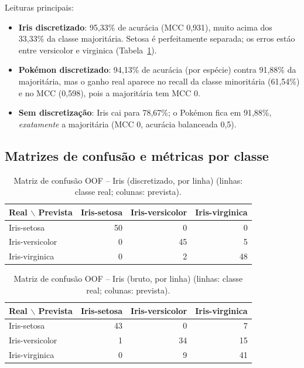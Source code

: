 \documentclass[a4paper,11pt]{article}
\begin{document}
Leituras principais:
\begin{itemize}
  \item \textbf{Iris discretizado}: 95,33\% de acur\'acia (MCC 0,931), muito acima dos 33,33\% da classe majorit\'aria. Setosa \'e perfeitamente separada; os erros est\'ao entre versicolor e virginica (Tabela~\ref{tab:conf_iris_disc}).
  \item \textbf{Pok\'emon discretizado}: 94,13\% de acur\'acia (por esp\'ecie) contra 91,88\% da majorit\'aria, mas o ganho real aparece no recall da classe minorit\'aria (61,54\%) e no MCC (0,598), pois a majorit\'aria tem MCC 0.
  \item \textbf{Sem discretiza\c{c}\~ao}: Iris cai para 78,67\%; o Pok\'emon fica em 91,88\%, \emph{exatamente} a majorit\'aria (MCC 0, acur\'acia balanceada 0,5).
\end{itemize}

\subsection{Matrizes de confus\~ao e m\'etricas por classe}
\begin{table}[htbp]
\centering
\small
\caption{Matriz de confusão OOF -- Iris (discretizado, por linha) (linhas: classe real; colunas: prevista).}
\label{tab:conf_iris_disc}
\begin{tabular}{lrrr}
\toprule
Real $\backslash$ Prevista & Iris-setosa & Iris-versicolor & Iris-virginica \\
\midrule
Iris-setosa & 50 & 0 & 0 \\
Iris-versicolor & 0 & 45 & 5 \\
Iris-virginica & 0 & 2 & 48 \\
\bottomrule
\end{tabular}
\end{table}

\begin{table}[htbp]
\centering
\small
\caption{Matriz de confusão OOF -- Iris (bruto, por linha) (linhas: classe real; colunas: prevista).}
\label{tab:conf_iris_raw}
\begin{tabular}{lrrr}
\toprule
Real $\backslash$ Prevista & Iris-setosa & Iris-versicolor & Iris-virginica \\
\midrule
Iris-setosa & 43 & 0 & 7 \\
Iris-versicolor & 1 & 34 & 15 \\
Iris-virginica & 0 & 9 & 41 \\
\bottomrule
\end{tabular}
\end{table}
\end{document}
